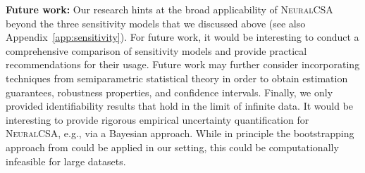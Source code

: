 \documentclass{article} %
\newcommand{\frameworkname}{\textsc{NeuralCSA}\xspace}
\theoremstyle{definition}
\theoremstyle{plain}
\begin{document}
\textbf{Future work:} Our research hints at the broad applicability of \frameworkname beyond the three sensitivity models that we discussed above (see also Appendix~\ref{app:sensitivity}). For future work, it would be interesting to conduct a comprehensive comparison of sensitivity models and provide practical recommendations for their usage. Future work may further consider incorporating techniques from semiparametric statistical theory in order to obtain estimation guarantees, robustness properties, and confidence intervals. Finally, we only provided identifiability results that hold in the limit of infinite data. It would be interesting to provide rigorous empirical uncertainty quantification for \frameworkname, e.g., via a Bayesian approach. While in principle the bootstrapping approach from \citep{Jesson.2022} could be applied in our setting, this could be computationally infeasible for large datasets.
\end{document}
